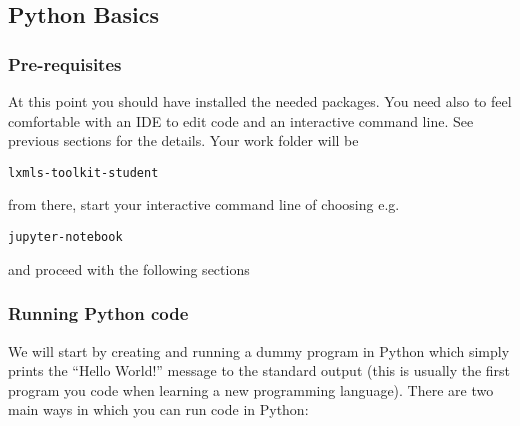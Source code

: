 \subsection{Python Basics}

\subsubsection{Pre-requisites}

At this point you should have installed the needed packages. You need also to feel comfortable with an IDE to edit code and an interactive command line. See previous sections for the details. Your work folder will be

\begin{verbatim}
lxmls-toolkit-student
\end{verbatim}

\noindent from there, start your interactive command line of choosing e.g.

\begin{verbatim}
jupyter-notebook
\end{verbatim}

\noindent and proceed with the following sections

\subsubsection{Running Python code}

We will start by creating and running a dummy program in Python which simply
prints the ``Hello World!'' message to the standard output (this is usually the
first program you code when learning a new programming language). There are two
main ways in which you can run code in Python: 

